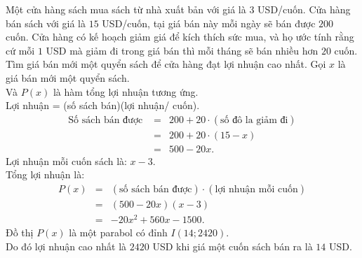 \begin{bt}%
	Một cửa hàng sách mua sách từ nhà xuất bản với giá là $3$ USD/cuốn. Cửa hàng bán sách với giá là $15$  USD/cuốn, tại giá bán này mỗi ngày sẽ bán được $200$ cuốn. Cửa hàng có kế hoạch giảm giá để kích thích sức mua, và họ ước tính rằng cứ mỗi $1$ USD mà giảm đi trong giá bán thì mỗi tháng sẽ bán nhiều hơn $20$ cuốn. Tìm giá bán mới một quyển sách để cửa hàng đạt lợi nhuận cao nhất.
	\loigiai
	{
		Gọi $x$ là giá bán mới một quyển sách.\\
		Và $P(x)$ là hàm tổng lợi nhuận tương ứng.\\
		Lợi nhuận = (số sách bán)(lợi nhuận/ cuốn).
		\allowdisplaybreaks
		\begin{eqnarray*}
			\text{Số sách bán được }& =&200+20 \cdot (\text{số đô la giảm đi})\\
			&= &200+20\cdot (15-x)\\
			&=& 500-20x.
		\end{eqnarray*}
		Lợi nhuận mỗi cuốn sách là: $x-3$.\\
		Tổng lợi nhuận là:
		\allowdisplaybreaks
		\begin{eqnarray*}
			P(x)&=& (\text{số sách bán được})\cdot (\text{lợi nhuận mỗi cuốn})\\
			&= & (500-20x)(x-3)\\
			&= &-20x^2+560x-1500.
		\end{eqnarray*}
		Đồ thị $P(x)$ là một parabol có đỉnh $I(14;2420)$.\\
		Do đó lợi nhuận cao nhất là $2420$ USD khi giá một cuốn sách bán ra là $14$ USD.
	}
\end{bt}


